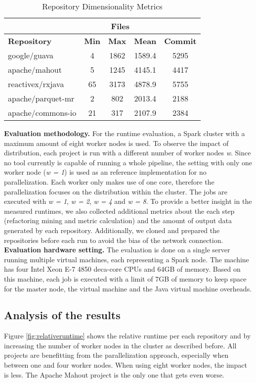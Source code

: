 \begin{table}[htbp]
\caption{Repository Dimensionality Metrics}
\label{tab:systems}
\begin{center}
\begin{tabular}{|l|c|c|c|c|}
\hline
&\multicolumn{3}{c|}{Files}&\\
\hline
\textbf{Repository}&\textbf{Min}&\textbf{Max}&\textbf{Mean}&\textbf{Commit}\\
\hline
google/guava& 4 & 1862 & 1589.4 & 5295\\
\hline
apache/mahout& 5 & 1245 & 4145.1 & 4417\\
\hline
reactivex/rxjava& 65 & 3173 & 4878.9 & 5755\\
\hline
apache/parquet-mr & 2 & 802 & 2013.4 & 2188\\
\hline
apache/commons-io & 21 & 317 & 2107.9 & 2384\\
\hline
\end{tabular}
\end{center}
\end{table}

\textbf{Evaluation methodology.} For the runtime evaluation, a Spark cluster with a maximum amount of eight worker nodes is used. To observe the impact of distribution, each project is run with a different number of worker nodes \emph{w}. Since no tool currently is capable of running a whole pipeline, the setting with only one worker node (\emph{w = 1}) is used as an reference implementation for no parallelization. Each worker only makes use of one core, therefore the parallelization focuses on the distribution within the cluster. The jobs are executed with \emph{w = 1}, \emph{w = 2}, \emph{w = 4} and \emph{w = 8}. To provide a better insight in the measured runtimes, we also collected additional metrics about the each step (refactoring mining and metric calculation) and the amount of output data generated by each repository. Additionally, we cloned and prepared the repositories before each run to avoid the bias of the network connection.\\
\textbf{Evaluation hardware setting.} The evaluation is done on a single server running multiple virtual machines, each representing a Spark node. The machine has four Intel Xeon E-7 4850 deca-core CPUs and 64GB of memory. Based on this machine, each job is executed with a limit of 7GB of memory to keep space for the master node, the virtual machine and the Java virtual machine overheads.

\subsection{Analysis of the results}
Figure \ref{fig:relativeruntime} shows the relative runtime per each repository and by increasing the number of worker nodes in the cluster as described before. All projects are benefitting from the parallelization approach, especially when between one and four worker nodes. When using eight worker nodes, the impact is less. The Apache Mahout project is the only one that gets even worse.


